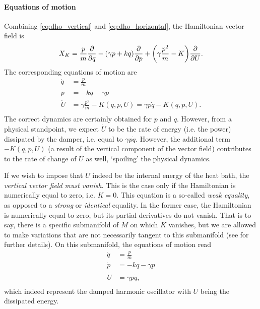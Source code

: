 \paragraph{Equations of motion} Combining \cref{eq:dho_vertical} and \cref{eq:dho_horizontal}, the Hamiltonian vector field is
\begin{equation}
     X_K = \frac{p}{m}\pdv{}{q} - (\gamma p + kq)\pdv{}{p} + \qty(\gamma \frac{p^2}{m} - K)\pdv{}{U}.
\end{equation}
The corresponding equations of motion are 
\begin{equation}
    \begin{split}
        \dot{q} &= \frac{p}{m} \\
        \dot{p} &= -kq -\gamma p \\
        \dot{U} &= \gamma \frac{p^2}{m} - K(q, p, U) = \gamma p\dot{q} - K(q, p, U). \\
    \end{split}
\end{equation}
The correct dynamics are certainly obtained for \(p\) and \(q\). However, from a physical standpoint, we expect \(\dot{U}\) to be the rate of energy (i.e. the power) dissipated by the damper, i.e. equal to \(\gamma p \dot{q}\). However, the additional term \(-K(q, p, U)\) (a result of the vertical component of the vector field) contributes to the rate of change of \(U\) as well, `spoiling' the physical dynamics.

If we wish to impose that \(U\) indeed be the internal energy of the heat bath, the \emph{vertical vector field must vanish}. This is the case only if the Hamiltonian is numerically equal to zero, i.e. \(K = 0\). This equation is a so-called \emph{weak equality}, as opposed to a \emph{strong} or \emph{identical} equality. In the former case, the Hamiltonian is numerically equal to zero, but its partial derivatives do not vanish. That is to say, there is a specific submanifold of \(M\) on which \(K\) vanishes, but we are allowed to make variations that are not necessarily tangent to this submanifold (see \citet{Dirac1950} for further details). On this submanifold, the equations of motion read
\begin{equation}
    \begin{split}
        \dot{q} &= \frac{p}{m} \\
        \dot{p} &= -kq -\gamma p \\
        \dot{U} &= \gamma p\dot{q},\\
    \end{split}
\end{equation}
which indeed represent the damped harmonic oscillator with \(U\) being the dissipated energy.

